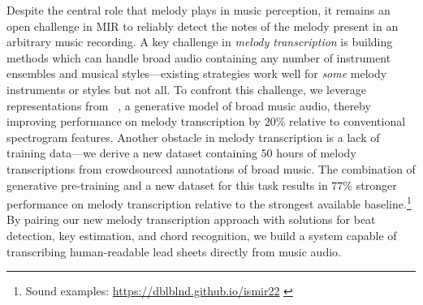 Despite the central role that melody plays in music perception, 
it remains an open challenge in MIR to reliably detect the notes of the melody present in an arbitrary music recording. 
A key challenge in \emph{melody transcription} is building methods which can handle broad audio containing any number of instrument ensembles and musical styles---existing strategies work well for \emph{some} melody instruments or styles but not all. 
To confront this challenge, we leverage representations from \jukebox{}~\cite{dhariwal2020jukebox}, 
a generative model of broad music audio, 
thereby improving performance on melody transcription by 
$20$\% 
relative to conventional spectrogram features. 
Another obstacle in melody transcription is a lack of training data---we derive a new dataset containing $50$ hours of melody transcriptions from crowdsourced annotations of broad music. 
The combination of generative pre-training and a new dataset for this task results in 
$77\%$ stronger performance on melody transcription relative to the strongest available baseline.\footnote{\vspace{-5mm}Sound examples: \url{https://dblblnd.github.io/ismir22} %
\label{sound_examples}} 
By pairing our new melody transcription approach with solutions for beat detection, key estimation, and chord recognition, 
we build a system capable of transcribing human-readable lead sheets directly from music audio.